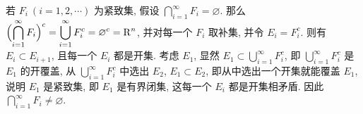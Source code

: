 \begin{enumerate}
        若 $F_i\ (i = 1, 2, \cdots)$ 为紧致集, 假设 $\displaystyle{\bigcap_{i=1}^{\infty}F_i = \varnothing}$.
        那么 $\displaystyle{\Bigl(\bigcap_{i=1}^{\infty}F_i\Bigr)^c = \bigcup_{i=1}^{\infty}F_i^c = \varnothing^c = \mathrm{R}^n}$, 并对每一个 $F_i$ 取补集, 并令 $E_i = F_i^c$.
        则有 $E_i \subset E_{i+1}$, 且每一个 $E_i$ 都是开集. 考虑 $E_1$, 显然 $E_1 \subset \bigcup_{i=1}^{\infty}F_i^c$, 即 $\bigcup_{i=1}^{\infty}F_i^c$ 是 $E_1$ 的开覆盖,
        从 $\bigcup_{i=1}^{\infty}F_i^c$ 中选出 $E_2$, $E_1 \subset E_2$, 即从中选出一个开集就能覆盖 $E_1$, 说明 $E_1$ 是紧致集, 即 $E_1$ 是有界闭集, 这每一个 $E_i$ 都是开集相矛盾.
        因此 $\displaystyle{\bigcap_{i=1}^{\infty}F_i \neq \varnothing}$.
\end{enumerate}
% 